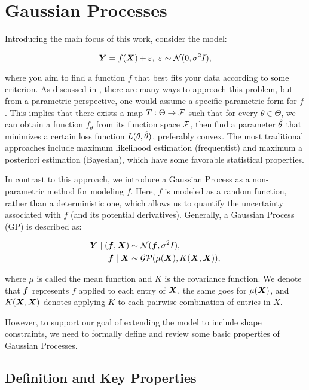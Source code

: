 \section{Gaussian Processes}

Introducing the main focus of this work, consider the model:

\begin{equation}
    \boldsymbol{Y} = f(\boldsymbol{X}) + \varepsilon,\ \varepsilon \sim \mathcal{N}(0, \sigma^2 I), 
\end{equation}

where you aim to find a function \( f \) that best fits your data according to some criterion.
As discussed in , there are many ways to approach this problem, but from a parametric perspective, one would assume a specific parametric form for \( f \).
This implies that there exists a map \( T:\Theta \to \mathcal{F} \) such that for every \( \theta \in \Theta \), we can obtain a function \( f_\theta \) from its function space \( \mathcal{F} \), then find a parameter \( \hat{\theta} \) that minimizes a certain loss function \( L(\theta, \hat{\theta}) \), preferably convex.
The most traditional approaches include maximum likelihood estimation (frequentist) and maximum a posteriori estimation (Bayesian), which have some favorable statistical properties.

In contrast to this approach, we introduce a Gaussian Process as a non-parametric method for modeling \( f \). Here, \( f \) is modeled as a random function, rather than a deterministic one, which allows us to quantify the uncertainty associated with \( f \) (and its potential derivatives). Generally, a Gaussian Process (GP) is described as:

\begin{align}
    \boldsymbol{Y} \mid (\boldsymbol{f}, \boldsymbol{X}) &\sim \mathcal{N}(\boldsymbol{f}, \sigma^2 I),\\
    \boldsymbol{f} \mid \boldsymbol{X} &\sim \mathcal{GP}(\mu(\boldsymbol{X}), K(\boldsymbol{X}, \boldsymbol{X})),
\end{align}

where \( \mu \) is called the mean function and \( K \) is the covariance function.
We denote that \( \boldsymbol{f} \) represents \( f \) applied to each entry of \( \boldsymbol{X} \), the same goes for \( \mu(\boldsymbol{X}) \), and \( K(\boldsymbol{X}, \boldsymbol{X}) \) denotes applying \( K \) to each pairwise combination of entries in \( X \). 

However, to support our goal of extending the model to include shape constraints, we need to formally define and review some basic properties of Gaussian Processes.


\subsection{Definition and Key Properties}

